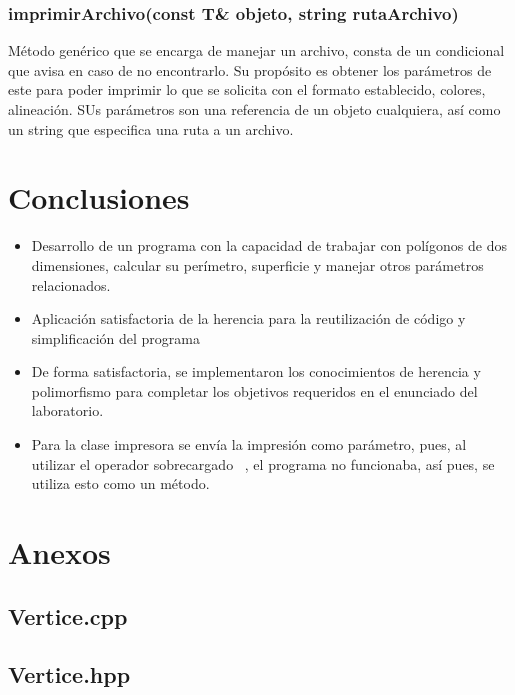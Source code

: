 \documentclass[11pt]{article}
\begin{document}
\begin{itemize}
\subsubsection{imprimirArchivo(const T\& objeto, string rutaArchivo)}
	Método genérico que se encarga de manejar un archivo, consta de un condicional que avisa en caso de no encontrarlo. Su propósito es obtener los parámetros de este para poder imprimir lo que se solicita con el formato establecido, colores, alineación. SUs parámetros son una referencia de un objeto cualquiera, así como un string que especifica una ruta a un archivo.

\section{Conclusiones}

\begin{itemize}
		\item Desarrollo de un programa con la capacidad de trabajar con polígonos de dos dimensiones, calcular su perímetro, superficie y manejar otros parámetros relacionados.
		\item Aplicación satisfactoria de la herencia para la reutilización de código y simplificación del programa
		\item De forma satisfactoria, se implementaron los conocimientos de herencia y polimorfismo para completar los objetivos requeridos en el enunciado del laboratorio.
		\item Para la clase impresora se envía la impresión como parámetro, pues, al utilizar el operador sobrecargado  ~, el programa no funcionaba, así pues, se utiliza esto como un método.
		
	\end{itemize}

\newpage
\section{Anexos}

\subsection{Vertice.cpp}

\newpage

\subsection{Vertice.hpp}

\newpage



\end{itemize}
\end{document}
